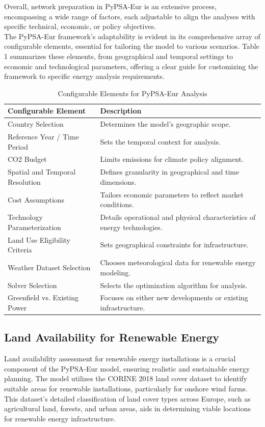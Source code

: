 Overall, network preparation in PyPSA-Eur is an extensive process, encompassing a wide range of factors, each adjustable to align the analyses with specific technical, economic, or policy objectives.\\

The PyPSA-Eur framework's adaptability is evident in its comprehensive array of configurable elements, essential for tailoring the model to various scenarios. Table 1 summarizes these elements, from geographical and temporal settings to economic and technological parameters, offering a clear guide for customizing the framework to specific energy analysis requirements.

\begin{table}[H]
\centering
\caption{Configurable Elements for PyPSA-Eur Analysis}
\label{tab:pypsa_config}
\renewcommand{\arraystretch}{1.5} %
\begin{tabular}{ll}
\textbf{Configurable Element} & \textbf{Description} \\
\midrule
Country Selection & Determines the model's geographic scope. \\
Reference Year / Time Period & Sets the temporal context for analysis. \\
CO2 Budget & Limits emissions for climate policy alignment. \\
Spatial and Temporal Resolution & Defines granularity in geographical and time dimensions. \\
Cost Assumptions & Tailors economic parameters to reflect market conditions. \\
Technology Parameterization & Details operational and physical characteristics of energy technologies. \\
Land Use Eligibility Criteria & Sets geographical constraints for infrastructure. \\
Weather Dataset Selection & Chooses meteorological data for renewable energy modeling. \\
Solver Selection & Selects the optimization algorithm for analysis. \\
Greenfield vs. Existing Power & Focuses on either new developments or existing infrastructure. \\
\end{tabular}
\end{table}





\subsection{Land Availability for Renewable Energy}
Land availability assessment for renewable energy installations is a crucial component of the PyPSA-Eur model, ensuring realistic and sustainable energy planning. The model utilizes the CORINE 2018 land cover dataset to identify suitable areas for renewable installations, particularly for onshore wind farms. This dataset's detailed classification of land cover types across Europe, such as agricultural land, forests, and urban areas, aids in determining viable locations for renewable energy infrastructure.\\


